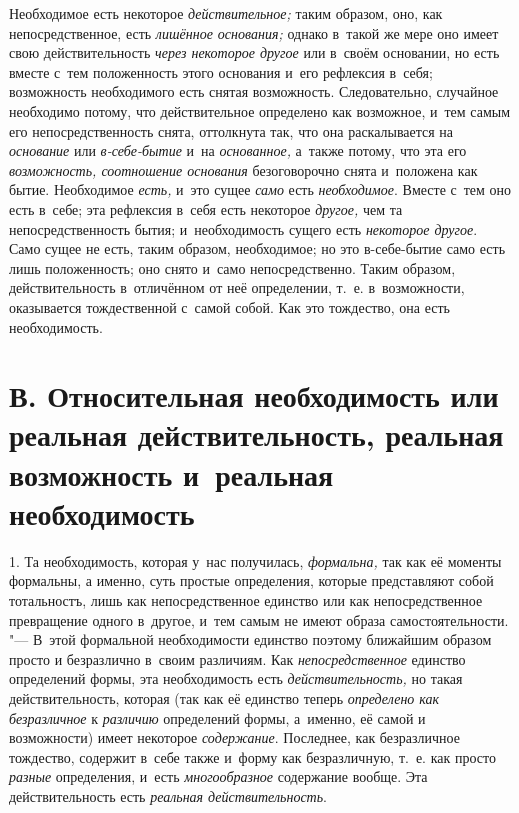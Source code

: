 Необходимое есть некоторое {\em действительное;} таким
образом, оно, как непосредственное, есть {\em лишённое
основания;} однако в~такой же мере оно имеет свою действительность
{\em через некоторое другое} или в~своём основании, но
есть вместе с~тем положенность этого основания и~его рефлексия в~себя;
возможность необходимого есть снятая возможность. Следовательно, случайное
необходимо потому, что действительное определено как возможное, и~тем самым
его непосредственность снята, оттолкнута так, что она раскалывается на
{\em основание} или {\em в-себе-бытие} и~на
{\em основанное,} а~также потому, что эта его
{\em возможность, соотношение основания} безоговорочно
снята и~положена как бытие. Необходимое {\em есть,} и~это сущее {\em само} есть
{\em необходимое}. Вместе с~тем оно есть в~себе; эта
рефлексия в~себя есть некоторое {\em другое,} чем та
непосредственность бытия; и~необходимость сущего есть
{\em некоторое другое}. Само сущее не есть, таким
образом, необходимое; но это в-себе-бытие само есть лишь положенность; оно
снято и~само непосредственно. Таким образом, действительность в~отличённом
от неё определении, т.~е. в~возможности, оказывается тождественной с~самой
собой. Как это тождество, она есть необходимость.


\section[В. Относительная необходимость или реальная действительность, реальная возможность и~реальная необходимость]%
{В. Относительная необходимость или реальная действительность, реальная возможность и~реальная необходимость}

1. Та необходимость, которая у~нас получилась,
{\em формальна,} так как её моменты формальны, а
именно, суть простые определения, которые представляют собой тотальностъ,
лишь как непосредственное единство или как непосредственное превращение
одного в~другое, и~тем самым не имеют образа самостоятельности. "--- В~этой
формальной необходимости единство поэтому ближайшим образом просто и
безразлично в~своим различиям. Как
{\em непосредственное} единство определений формы, эта
необходимость есть {\em действительность,} но такая
действительность, которая (так как её единство теперь
{\em определено как безразличное} к
{\em различию} определений формы, а~именно, её самой и
возможности) имеет некоторое {\em содержание}.
Последнее, как безразличное тождество, содержит в~себе также и~форму как
безразличную, т.~е. как просто {\em разные}
определения, и~есть {\em многообразное} содержание
вообще. Эта действительность есть {\em реальная действительность}.

